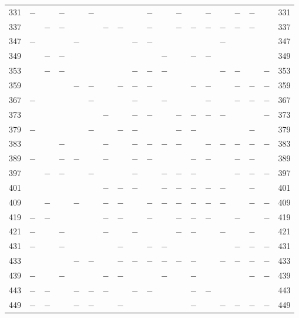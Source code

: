 \begin{center}
\begin{tabular}{r|c|c|c|c|c|c|c|c|c|c|c|c|c|c|c|c|c|r}
331 & $-$ &  & $-$ &  & $-$ &  &  &  & $-$ &  & $-$ &  & $-$ &  & $-$ & $-$ &  & 331\\
337 &  & $-$ & $-$ &  &  & $-$ & $-$ &  & $-$ &  & $-$ & $-$ & $-$ & $-$ & $-$ & $-$ &  & 337\\
347 & $-$ &  &  & $-$ &  &  &  & $-$ & $-$ &  &  &  &  & $-$ &  &  &  & 347\\
349 &  & $-$ & $-$ &  &  &  &  &  &  & $-$ &  & $-$ & $-$ &  &  &  &  & 349\\
353 &  & $-$ & $-$ &  &  &  &  & $-$ & $-$ & $-$ &  &  &  & $-$ & $-$ &  & $-$ & 353\\
359 &  &  &  & $-$ & $-$ &  & $-$ & $-$ & $-$ &  &  & $-$ & $-$ &  & $-$ & $-$ & $-$ & 359\\
367 & $-$ &  &  &  & $-$ &  &  & $-$ &  & $-$ &  &  & $-$ &  & $-$ & $-$ & $-$ & 367\\
373 &  &  &  &  &  & $-$ &  & $-$ & $-$ &  & $-$ & $-$ & $-$ & $-$ &  &  & $-$ & 373\\
379 & $-$ &  &  &  & $-$ &  & $-$ & $-$ &  &  & $-$ & $-$ &  &  &  & $-$ &  & 379\\
383 &  &  & $-$ &  &  & $-$ &  & $-$ & $-$ & $-$ & $-$ &  & $-$ & $-$ & $-$ & $-$ & $-$ & 383\\
389 & $-$ &  & $-$ & $-$ &  & $-$ &  & $-$ & $-$ &  &  & $-$ & $-$ &  & $-$ & $-$ &  & 389\\
397 &  & $-$ & $-$ &  & $-$ &  &  & $-$ &  & $-$ & $-$ & $-$ &  &  & $-$ & $-$ & $-$ & 397\\
401 &  &  &  &  &  & $-$ & $-$ & $-$ &  & $-$ & $-$ & $-$ & $-$ & $-$ &  & $-$ &  & 401\\
409 &  & $-$ &  & $-$ &  & $-$ & $-$ &  & $-$ & $-$ & $-$ & $-$ & $-$ & $-$ &  & $-$ & $-$ & 409\\
419 & $-$ & $-$ &  &  &  & $-$ & $-$ &  & $-$ &  & $-$ & $-$ & $-$ &  & $-$ &  & $-$ & 419\\
421 & $-$ &  & $-$ &  &  & $-$ &  & $-$ &  &  & $-$ & $-$ &  & $-$ &  & $-$ &  & 421\\
431 & $-$ &  & $-$ &  &  &  & $-$ &  & $-$ & $-$ &  &  &  &  & $-$ & $-$ & $-$ & 431\\
433 &  &  &  & $-$ & $-$ &  & $-$ & $-$ & $-$ & $-$ & $-$ & $-$ &  & $-$ & $-$ & $-$ & $-$ & 433\\
439 & $-$ &  & $-$ &  &  & $-$ & $-$ &  &  & $-$ &  & $-$ &  &  &  & $-$ & $-$ & 439\\
443 & $-$ & $-$ &  & $-$ & $-$ & $-$ &  & $-$ & $-$ &  &  & $-$ & $-$ &  &  &  &  & 443\\
449 & $-$ & $-$ &  & $-$ & $-$ &  & $-$ &  &  &  &  & $-$ &  & $-$ & $-$ & $-$ & $-$ & 449\\

\end{tabular}
\end{center}
